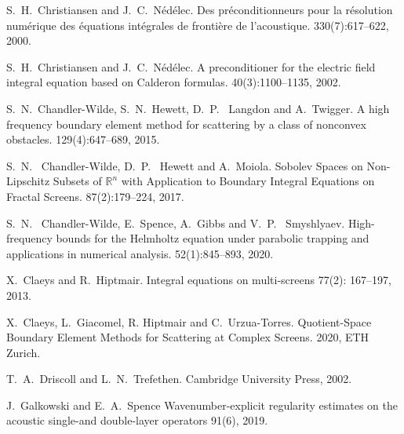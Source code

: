 \documentclass[]{article}
\begin{document}
\begin{small}
\begin{thebibliography}{0}
		S.~H.~Christiansen and J.~C.~Nédélec.
		\newblock Des préconditionneurs pour la résolution numérique des équations intégrales de frontière de l'acoustique.
		  330(7):617--622, 2000.
		
		S.~H.~Christiansen and J.~C.~Nédélec.
		\newblock A preconditioner for the electric field integral equation based on Calderon formulas.
		  40(3):1100--1135, 2002.
		
		S.~N.~Chandler-Wilde, S.~N.~Hewett, D.~P.~ Langdon and A.~Twigger.
		\newblock A high frequency boundary element method for scattering by a class of nonconvex obstacles.
		 129(4):647--689, 2015.
		
		S.~N.~ Chandler-Wilde, D.~P.~ Hewett and A.~Moiola.
		\newblock Sobolev Spaces on Non-Lipschitz Subsets of ${\mathbb {R}}^n$ with Application to Boundary Integral Equations on Fractal Screens. 
		 87(2):179--224, 2017.
		
		S.~N.~ Chandler-Wilde, E.~Spence, A.~Gibbs and V.~P.~ Smyshlyaev.
		\newblock High-frequency bounds for the Helmholtz equation under parabolic trapping and applications in numerical analysis.
		52(1):845--893, 2020.	
		
		X.~Claeys and R.~Hiptmair.
		\newblock Integral equations on multi-screens
		 77(2): 167--197, 2013.
		
		X.~Claeys, L.~Giacomel, R. Hiptmair and C.~Urzua-Torres.
		\newblock Quotient-Space Boundary Element Methods for Scattering at Complex Screens.
		 2020, ETH Zurich.
		
		T.~A.~Driscoll and L.~N.~Trefethen.
		\newblock Cambridge University Press, 2002.
		
		J.~Galkowski and E.~A.~Spence
		\newblock Wavenumber-explicit regularity estimates on the acoustic single-and double-layer operators
		91(6), 2019.
		

\end{thebibliography}
\end{small}
\end{document}
